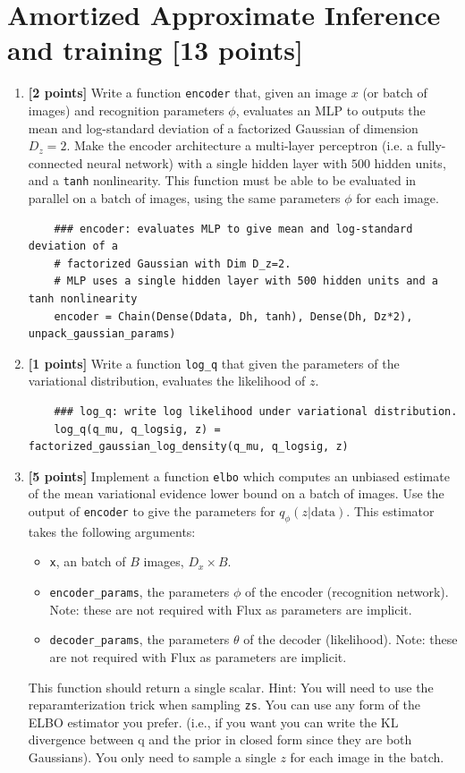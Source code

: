 \documentclass{article}
\begin{document}
\section{Amortized Approximate Inference and training [13 points]}
\begin{enumerate}[label=(\alph*)]
  	\item {\bf [2 points]} Write a function \texttt{encoder} that, given an image $x$ (or batch of images) and recognition parameters $\phi$, evaluates an MLP to outputs the mean and log-standard deviation of a factorized Gaussian of dimension $D_z = 2$.
	Make the encoder architecture a multi-layer perceptron (i.e. a fully-connected neural network) with a single hidden layer with $500$ hidden units, and a \texttt{tanh} nonlinearity.
	This function must be able to be evaluated in parallel on a batch of images, using the same parameters $\phi$ for each image.

	\begin{lstlisting}
	### encoder: evaluates MLP to give mean and log-standard deviation of a 
	# factorized Gaussian with Dim D_z=2.
	# MLP uses a single hidden layer with 500 hidden units and a tanh nonlinearity
	encoder = Chain(Dense(Ddata, Dh, tanh), Dense(Dh, Dz*2), unpack_gaussian_params)
	\end{lstlisting}

	\item {\bf [1 points]} Write a function \texttt{log\_q} that given the parameters of the variational distribution, evaluates the likelihood of $z$.
	
	\begin{lstlisting}
	### log_q: write log likelihood under variational distribution.
	log_q(q_mu, q_logsig, z) = factorized_gaussian_log_density(q_mu, q_logsig, z)
	\end{lstlisting}
	
	\item {\bf [5 points]} Implement a function \texttt{elbo} which computes an unbiased estimate of the mean variational evidence lower bound on a batch of images.
	Use the output of \texttt{encoder} to give the parameters for $q_\phi(z|\text{data})$.
	This estimator takes the following arguments:
	\begin{itemize}
		\item \texttt{x}, an batch of $B$ images, $D_x \times B$.
    	\item \texttt{encoder\_params}, the parameters $\phi$ of the encoder (recognition network). Note: these are not required with Flux as parameters are implicit.
		\item \texttt{decoder\_params}, the parameters $\theta$ of the decoder (likelihood). Note: these are not required with Flux as parameters are implicit.
	\end{itemize}
	This function should return a single scalar.
	Hint: You will need to use the reparamterization trick when sampling \texttt{zs}.
	You can use any form of the ELBO estimator you prefer.
  	(i.e., if you want you can write the KL divergence between q and the prior in closed form since they are both Gaussians).
	You only need to sample a single $z$ for each image in the batch.


\end{enumerate}
\end{document}
